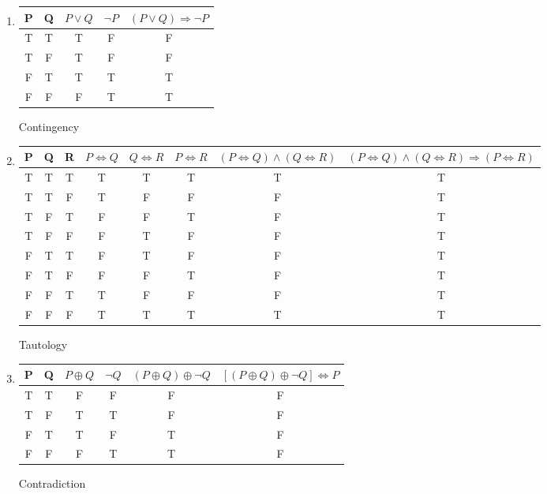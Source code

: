 \documentclass{article}
\theoremstyle{definition}
\begin{document}
\begin{enumerate} [label = \alph*)]

\item  
\begin{tabular}{|c|c|c|c|c|}
    \hline
    P & Q & $P \vee Q$ & $\neg P$ & $(P \vee Q) \Rightarrow \neg P$ \\ \hline
    T & T & T & F & F \\ \hline
    T & F & T & F & F \\ \hline
    F & T & T & T & T \\ \hline
    F & F & F & T & T \\ \hline
\end{tabular}

Contingency
\item
\begin{tabular}{|c|c|c|c|c|c|c|c|}
    \hline
     P & Q & R & $P \Leftrightarrow Q$ & $Q \Leftrightarrow R$ & $P \Leftrightarrow R$ & $(P \Leftrightarrow Q) \wedge (Q \Leftrightarrow R)$ & $(P \Leftrightarrow Q) \wedge (Q \Leftrightarrow R) \Rightarrow (P \Leftrightarrow R)$\\ \hline
     T & T & T & T & T & T & T & T \\ \hline
     T & T & F & T & F & F & F & T \\ \hline
     T & F & T & F & F & T & F & T \\ \hline
     T & F & F & F & T & F & F & T \\ \hline
     F & T & T & F & T & F & F & T \\ \hline
     F & T & F & F & F & T & F & T \\ \hline
     F & F & T & T & F & F & F & T \\ \hline
     F & F & F & T & T & T & T & T \\ \hline
\end{tabular}

Tautology 
\item
\begin{tabular}{|c|c|c|c|c|c|}
    \hline
    P & Q & $P \oplus Q$ & $\neg Q$ & $(P \oplus Q) \oplus \neg Q$ & $[(P \oplus Q) \oplus \neg Q] \Leftrightarrow P$ \\ \hline
    T & T & F & F & F & F \\ \hline
    T & F & T & T & F & F \\ \hline
    F & T & T & F & T & F \\ \hline
    F & F & F & T & T & F \\ \hline
\end{tabular}

Contradiction
\end{enumerate}
\end{document}
